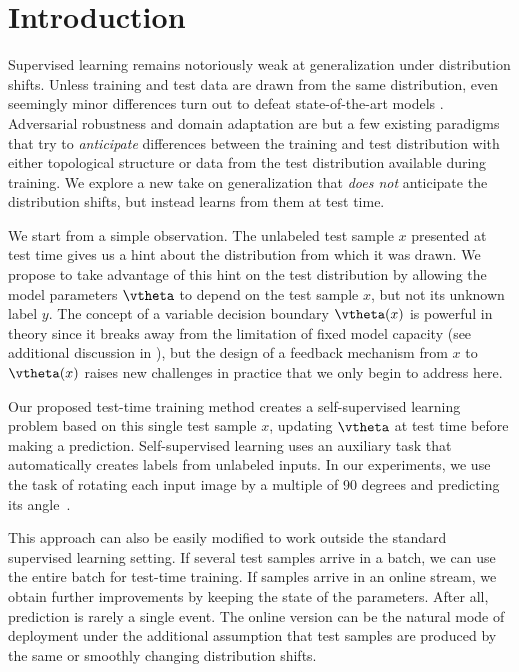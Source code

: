 \section{Introduction}
\label{intro}

Supervised learning remains notoriously weak at generalization under distribution shifts.
Unless training and test data are drawn from the same distribution, even seemingly minor differences turn out to defeat state-of-the-art models \citep{recht2018cifar}.
Adversarial robustness and domain adaptation are but a few existing paradigms that try to \textit{anticipate} differences between the training and test distribution with either topological structure or data from the test distribution available during training.
We explore a new take on generalization that \textit{does not} anticipate the distribution shifts, but instead learns from them at test time.

We start from a simple observation. 
The unlabeled test sample $x$ presented at test time gives us a hint about the distribution from which it was drawn. 
We propose to take advantage of this hint on the test distribution by allowing the model parameters $\vtheta$
to depend on the test sample $x$, but not its unknown label $y$.
The concept of a variable decision boundary $\vtheta(x)$ is powerful in theory since it breaks away from the limitation of fixed model capacity (see additional discussion in ), but the design of a feedback mechanism from $x$ to $\vtheta(x)$ raises new challenges in practice that we only begin to address here.

Our proposed test-time training method creates a self-supervised learning problem based on this single test sample $x$, updating $\vtheta$ at test time before making a prediction. 
Self-supervised learning uses an auxiliary task that automatically creates labels from unlabeled inputs.
In our experiments, we use the task of rotating each input image by a multiple of 90 degrees and predicting its angle~\citep{gidaris2018unsupervised}.

This approach can also be easily modified to work outside the standard supervised learning setting. 
If several test samples arrive in a batch, we can use the entire batch for test-time training.
If samples arrive in an online stream, we obtain further improvements by keeping the state of the parameters.
After all, prediction is rarely a single event. The online version can be the natural mode of deployment under the additional assumption that test samples are produced by the same or smoothly changing distribution shifts.

